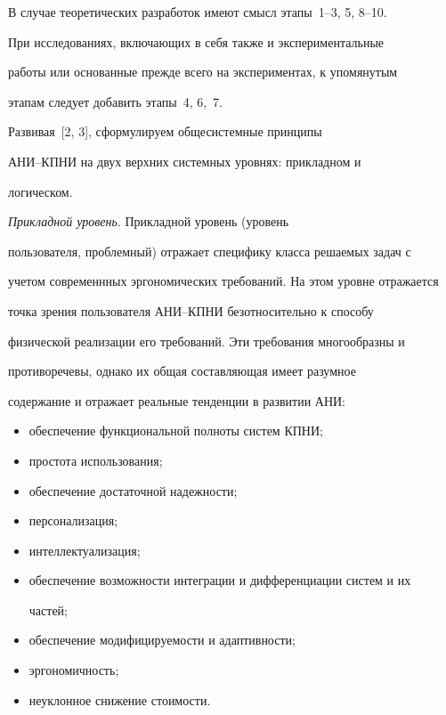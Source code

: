 В случае теоретических разработок имеют смысл этапы~1--3, 5, 8--10.


При исследованиях, включающих в себя также и экспериментальные


работы или основанные прежде всего на экспериментах, к упомянутым


этапам следует добавить этапы~4, 6,~7.





Развивая~[2, 3], сформулируем общесистемные принципы


\mbox{АНИ}--\mbox{КПНИ} на двух верхних системных уровнях: прикладном и


логическом.





\textit{Прикладной уровень}. Прикладной уровень (уровень


пользователя, проб\-лем\-ный) отражает специфику класса решаемых задач с


учетом современнных эргономических требований. На этом уровне отражается


точка зрения пользователя АНИ--КПНИ безотносительно к способу


физической реализации его требований. Эти требования многообразны и


противоречевы, однако их общая составляющая имеет разумное


содержание и отражает реальные тенденции в развитии  АНИ:


\begin{itemize}


\item  обеспечение функциональной полноты  систем КПНИ;


\item  простота использования;


\item  обеспечение достаточной надежности;


\item  персонализация;


\item  интеллектуализация;


\item  обеспечение возможности интеграции и дифференциации систем и их


частей;


\item  обеспечение модифицируемости и адаптивности;


\item  эргономичность;


\item  неуклонное снижение стоимости.


\end{itemize}





